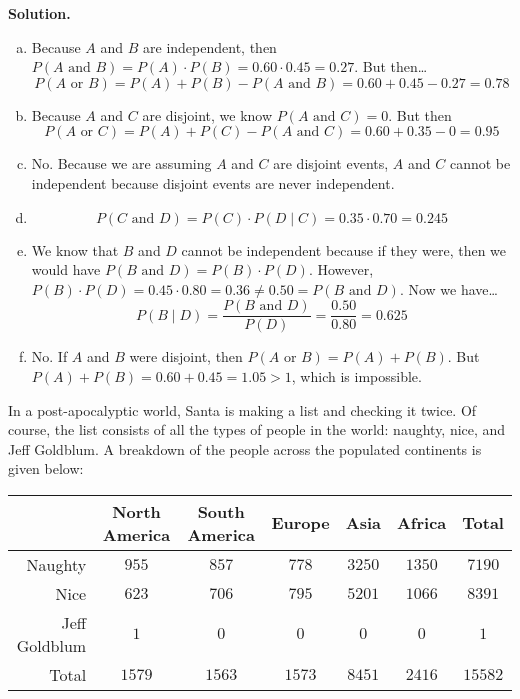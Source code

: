 \documentclass[12pt,letterpaper]{exam}
\begin{document}
\begin{questions}
{\noindent\bfseries Solution.}

\begin{enumerate}[(a)]
\item Because $A$ and $B$ are independent, then $P(A \text{ and } B)= P(A) \cdot P(B)= 0.60 \cdot 0.45= 0.27$. But then\dots
	\[
	P(A \text{ or } B)= P(A) + P(B) - P(A \text{ and } B)= 0.60 + 0.45 - 0.27= 0.78
	\] \vfill

\item Because $A$ and $C$ are disjoint, we know $P(A \text{ and }C)= 0$. But then
	\[
	P(A \text{ or } C)= P(A) + P(C) - P(A \text{ and } C)= 0.60 + 0.35 - 0= 0.95
	\] \vfill

\item No. Because we are assuming $A$ and $C$ are disjoint events, $A$ and $C$ cannot be independent because disjoint events are never independent. \vfill

\item 
	\[
	P(C \text{ and } D)= P(C) \cdot P(D \;|\; C)= 0.35 \cdot 0.70= 0.245
	\] \vfill

\item We know that $B$ and $D$ cannot be independent because if they were, then we would have $P(B \text{ and } D)= P(B) \cdot P(D)$. However, $P(B) \cdot P(D)= 0.45 \cdot 0.80= 0.36 \neq 0.50= P(B \text{ and } D)$. Now we have\dots
	\[
	P(B \;|\; D)= \dfrac{P(B \text{ and }D)}{P(D)}= \dfrac{0.50}{0.80}= 0.625
	\] \vfill

\item No. If $A$ and $B$ were disjoint, then $P(A \text{ or } B)= P(A) + P(B)$. But $P(A) + P(B)= 0.60 + 0.45= 1.05 > 1$, which is impossible. \vfill
\end{enumerate}





\newpage
\question In a post-apocalyptic world, Santa is making a list and checking it twice. Of course, the list consists of all the types of people in the world: naughty, nice, and Jeff Goldblum. A breakdown of the people across the populated continents is given below:
	\begin{table}[!ht]
	\centering
	\begin{tabular}{|r||c|c|c|c|c||c|} \hline
	& North America & South America & Europe & Asia & Africa & Total \\ \hline
	Naughty & $955$ & $857$ & $778$ & $3250$ & $1350$ & $7190$ \\ \hline
	Nice & $623$ & $706$ & $795$ & $5201$ & $1066$ & $8391$ \\ \hline
	Jeff Goldblum & $1$ & $0$ & $0$ & $0$ & $0$ & $1$ \\ \hline \hline
	Total & $1579$ & $1563$ & $1573$ & $8451$ & $2416$ & $15582$ \\ \hline
	\end{tabular}
	\end{table}


\end{questions}
\end{document}
